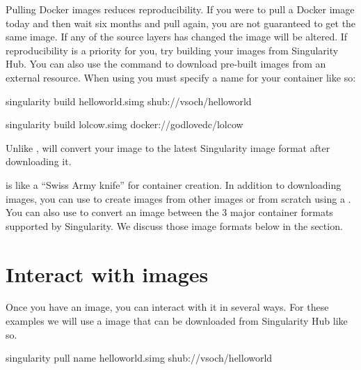 \documentclass[letterpaper,10pt,english]{sphinxmanual}
\begin{document}
Pulling Docker images reduces reproducibility. If you were to pull a
Docker image today and then wait six months and pull again, you are
not guaranteed to get the same image. If any of the source layers has
changed the image will be altered. If reproducibility is a priority
for you, try building your images from Singularity Hub.
You can also use the  command to download pre-built images from an
external resource. When using  you must specify a name for your
container like so:

%
\begin{sphinxVerbatim}[commandchars=\\\{\}]
\PYGZdl{} singularity build hello\PYGZhy{}world.simg shub://vsoch/hello\PYGZhy{}world

\PYGZdl{} singularity build lolcow.simg docker://godlovedc/lolcow
\end{sphinxVerbatim}

Unlike ,  will convert your image to the latest Singularity image format
after downloading it.

 is like a “Swiss Army knife” for container creation. In addition to
downloading images, you can use  to create images from other images or
from scratch using a . You can also use  to convert an image between the
3 major container formats supported by Singularity. We discuss those
image formats below in the {\hyperref[\detokenize{quick_start:build-images-from-scratch}]{}} section.


\section{Interact with images}
\label{\detokenize{quick_start:interact-with-images}}
Once you have an image, you can interact with it in several ways. For
these examples we will use a  image that can be downloaded from
Singularity Hub like so.

%
\begin{sphinxVerbatim}[commandchars=\\\{\}]
\PYGZdl{} singularity pull \PYGZhy{}\PYGZhy{}name hello\PYGZhy{}world.simg shub://vsoch/hello\PYGZhy{}world
\end{sphinxVerbatim}
\end{document}
